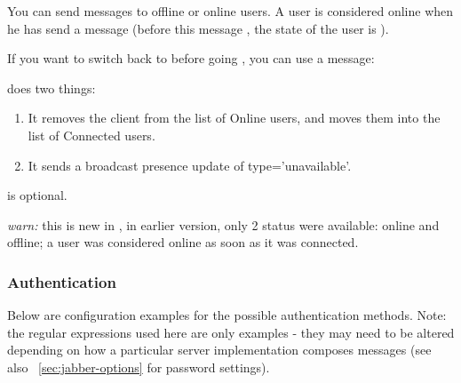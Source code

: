\documentclass{TSUNG-en}
\begin{document}
You can send messages to offline or online users. A user is considered
online when he has send a  message (before
this message , the state of the user is ).

If you want to switch back to  before going
, you can use a  message:

 does two things:
\begin{enumerate}
\item It removes the client from the list of Online users, and moves
  them into the list of Connected users.
\item  It sends a broadcast presence update of type='unavailable'.
\end{enumerate}

 is optional.

\emph{warn:} this is new in , in earlier version, only 2
status were available: online and offline; a user was considered
online as soon as it was connected.

\subsubsection{Authentication}

Below are configuration examples for the possible authentication
methods.  Note: the regular expressions used here are only examples -
they may need to be altered depending on how a particular server
implementation composes messages (see also ~\ref{sec:jabber-options}
for password settings).
\end{document}

